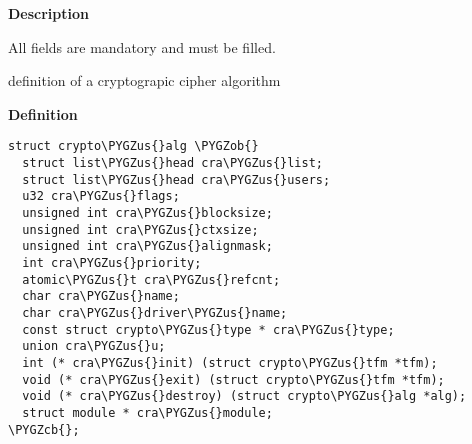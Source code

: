 \documentclass[a4paper,8pt,english]{sphinxmanual}
\def\PYGZus{\char`\_}
\def\PYGZob{\char`\{}
\def\PYGZcb{\char`\}}
\begin{document}
\textbf{Description}

All fields are mandatory and must be filled.

\begin{fulllineitems}
\label{crypto/api-skcipher:c.crypto_alg}
definition of a cryptograpic cipher algorithm

\end{fulllineitems}


\textbf{Definition}

\begin{Verbatim}[commandchars=\\\{\}]
struct crypto\PYGZus{}alg \PYGZob{}
  struct list\PYGZus{}head cra\PYGZus{}list;
  struct list\PYGZus{}head cra\PYGZus{}users;
  u32 cra\PYGZus{}flags;
  unsigned int cra\PYGZus{}blocksize;
  unsigned int cra\PYGZus{}ctxsize;
  unsigned int cra\PYGZus{}alignmask;
  int cra\PYGZus{}priority;
  atomic\PYGZus{}t cra\PYGZus{}refcnt;
  char cra\PYGZus{}name;
  char cra\PYGZus{}driver\PYGZus{}name;
  const struct crypto\PYGZus{}type * cra\PYGZus{}type;
  union cra\PYGZus{}u;
  int (* cra\PYGZus{}init) (struct crypto\PYGZus{}tfm *tfm);
  void (* cra\PYGZus{}exit) (struct crypto\PYGZus{}tfm *tfm);
  void (* cra\PYGZus{}destroy) (struct crypto\PYGZus{}alg *alg);
  struct module * cra\PYGZus{}module;
\PYGZcb{};
\end{Verbatim}
\end{document}
